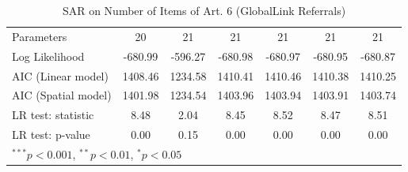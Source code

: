 \begin{table}[!h]
\begin{center}
\begin{tabular}{l c c c c c c }
Parameters              & 20           & 21           & 21           & 21           & 21           & 21           \\
Log Likelihood          & -680.99      & -596.27      & -680.98      & -680.97      & -680.95      & -680.87      \\
AIC (Linear model)      & 1408.46      & 1234.58      & 1410.41      & 1410.46      & 1410.38      & 1410.25      \\
AIC (Spatial model)     & 1401.98      & 1234.54      & 1403.96      & 1403.94      & 1403.91      & 1403.74      \\
LR test: statistic      & 8.48         & 2.04         & 8.45         & 8.52         & 8.47         & 8.51         \\
LR test: p-value        & 0.00         & 0.15         & 0.00         & 0.00         & 0.00         & 0.00         \\
\bottomrule
\multicolumn{7}{l}{\scriptsize{$^{***}p<0.001$, $^{**}p<0.01$, $^*p<0.05$}}
\end{tabular}
\caption{SAR on Number of Items of Art. 6 (GlobalLink Referrals)}
\label{table:coefficients}
\end{center}
\end{table}
